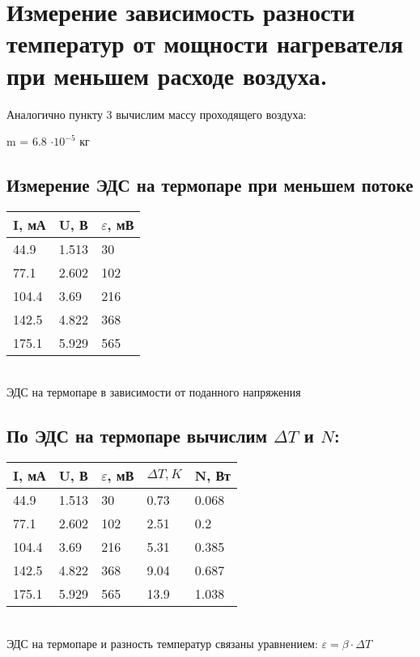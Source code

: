 \documentclass[a4paper,17pt]{article}
\begin{document}
\section{Измерение зависимость разности температур от мощности нагревателя при меньшем  расходе воздуха.}
    Аналогично пункту 3 вычислим массу проходящего воздуха:

    m = 6.8 $\cdot 10^{-5}$ кг
    
    \subsection{Измерение ЭДС на термопаре при меньшем потоке}
    
        \begin{center}
            \begin{tabular}{ | l | l | l |}
                \hline
                I, мА & U, В & $\varepsilon$, мВ \\ \hline
                44.9    &   1.513   &   30  \\
                77.1    &   2.602   &   102 \\
                104.4   &   3.69    &   216 \\
                142.5   &   4.822   &   368 \\
                175.1   &   5.929   &   565 \\
                \hline
            \end{tabular}\\
            ЭДС на термопаре в зависимости от поданного напряжения
        \end{center}
        
    \subsection{По ЭДС на термопаре вычислим $\Delta T$ и $N$:}
    
        \begin{center}
            \begin{tabular}{ | l | l | l | l | l |}
                \hline
                I, мА & U, В & $\varepsilon$, мВ & $\Delta T, K$ & N, Вт\\ \hline
                44.9    &   1.513   &   30      &   0.73    &   0.068   \\
                77.1    &   2.602   &   102     &   2.51    &   0.2     \\
                104.4   &   3.69    &   216     &   5.31    &   0.385   \\
                142.5   &   4.822   &   368     &   9.04    &   0.687   \\
                175.1   &   5.929   &   565     &   13.9    &   1.038   \\
                \hline
            \end{tabular}\\
            
            ЭДС на термопаре и разность температур связаны уравнением: $\varepsilon = \beta \cdot \Delta T$
        \end{center}
        
\end{document}
